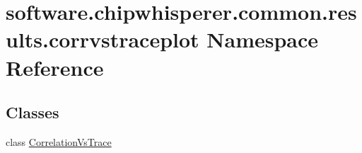 \hypertarget{namespacesoftware_1_1chipwhisperer_1_1common_1_1results_1_1corrvstraceplot}{}\section{software.\+chipwhisperer.\+common.\+results.\+corrvstraceplot Namespace Reference}
\label{namespacesoftware_1_1chipwhisperer_1_1common_1_1results_1_1corrvstraceplot}
\subsection*{Classes}
\begin{DoxyCompactItemize}
\item 
class \hyperlink{classsoftware_1_1chipwhisperer_1_1common_1_1results_1_1corrvstraceplot_1_1CorrelationVsTrace}{Correlation\+Vs\+Trace}
\end{DoxyCompactItemize}

